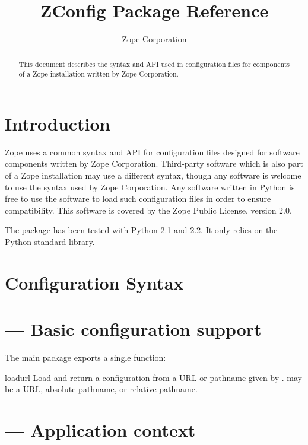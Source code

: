 \documentclass{howto}
\title{ZConfig Package Reference}
\author{Zope Corporation}
\begin{document}
\maketitle

\begin{abstract}
\noindent
This document describes the syntax and API used in configuration files
for components of a Zope installation written by Zope Corporation.
\end{abstract}

\tableofcontents


\section{Introduction \label{intro}}

Zope uses a common syntax and API for configuration files designed for
software components written by Zope Corporation.  Third-party software
which is also part of a Zope installation may use a different syntax,
though any software is welcome to use the syntax used by Zope
Corporation.  Any software written in Python is free to use the
 software to load such configuration files in order to
ensure compatibility.  This software is covered by the Zope Public
License, version 2.0.

The  package has been tested with Python 2.1 and 2.2.
It only relies on the Python standard library.


\section{Configuration Syntax \label{syntax}}


\section{ --- Basic configuration support}


The main  package exports a single function:

\begin{funcdesc}{load}{url}
  Load and return a configuration from a URL or pathname given by
  .   may be a URL, absolute pathname, or relative
  pathname.
\end{funcdesc}


\section{ --- Application context}
\end{document}
